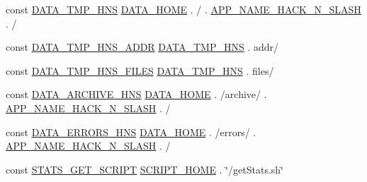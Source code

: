 \begin{DoxyCompactItemize}
\item 
const \hyperlink{application_2src_2define_8php_aac25d42dd518dd4e046490ac3c5b1f16}{D\+A\+T\+A\+\_\+\+T\+M\+P\+\_\+\+H\+NS} \hyperlink{application_2src_2define_8php_abd49961c9bba0d5462ea18f49f2e854b}{D\+A\+T\+A\+\_\+\+H\+O\+ME} . \textquotesingle{}/\textquotesingle{} . \hyperlink{application_2src_2define_8php_aafbb283144936400f27f3234053d0d8d}{A\+P\+P\+\_\+\+N\+A\+M\+E\+\_\+\+H\+A\+C\+K\+\_\+\+N\+\_\+\+S\+L\+A\+SH} . \textquotesingle{}/\textquotesingle{}
\item 
const \hyperlink{application_2src_2define_8php_adb6456774cde56cccf8a10ecd8b27f16}{D\+A\+T\+A\+\_\+\+T\+M\+P\+\_\+\+H\+N\+S\+\_\+\+A\+D\+DR} \hyperlink{application_2src_2define_8php_aac25d42dd518dd4e046490ac3c5b1f16}{D\+A\+T\+A\+\_\+\+T\+M\+P\+\_\+\+H\+NS} . \textquotesingle{}addr/\textquotesingle{}
\item 
const \hyperlink{application_2src_2define_8php_ab41d66a0819241fec75faaa2881b75f4}{D\+A\+T\+A\+\_\+\+T\+M\+P\+\_\+\+H\+N\+S\+\_\+\+F\+I\+L\+ES} \hyperlink{application_2src_2define_8php_aac25d42dd518dd4e046490ac3c5b1f16}{D\+A\+T\+A\+\_\+\+T\+M\+P\+\_\+\+H\+NS} . \textquotesingle{}files/\textquotesingle{}
\item 
const \hyperlink{application_2src_2define_8php_ac2e10636360f5b5b6fb26d0213e6bb2a}{D\+A\+T\+A\+\_\+\+A\+R\+C\+H\+I\+V\+E\+\_\+\+H\+NS} \hyperlink{application_2src_2define_8php_abd49961c9bba0d5462ea18f49f2e854b}{D\+A\+T\+A\+\_\+\+H\+O\+ME} . \textquotesingle{}/archive/\textquotesingle{} . \hyperlink{application_2src_2define_8php_aafbb283144936400f27f3234053d0d8d}{A\+P\+P\+\_\+\+N\+A\+M\+E\+\_\+\+H\+A\+C\+K\+\_\+\+N\+\_\+\+S\+L\+A\+SH} . \textquotesingle{}/\textquotesingle{}
\item 
const \hyperlink{application_2src_2define_8php_af4f12e457d3746e50a57c980b85c301b}{D\+A\+T\+A\+\_\+\+E\+R\+R\+O\+R\+S\+\_\+\+H\+NS} \hyperlink{application_2src_2define_8php_abd49961c9bba0d5462ea18f49f2e854b}{D\+A\+T\+A\+\_\+\+H\+O\+ME} . \textquotesingle{}/errors/\textquotesingle{} . \hyperlink{application_2src_2define_8php_aafbb283144936400f27f3234053d0d8d}{A\+P\+P\+\_\+\+N\+A\+M\+E\+\_\+\+H\+A\+C\+K\+\_\+\+N\+\_\+\+S\+L\+A\+SH} . \textquotesingle{}/\textquotesingle{}
\item 
const \hyperlink{application_2src_2define_8php_a226d66db407b69e575f25c7c46970fad}{S\+T\+A\+T\+S\+\_\+\+G\+E\+T\+\_\+\+S\+C\+R\+I\+PT} \hyperlink{application_2src_2define_8php_a9804a4355514926fe48d229604f4c134}{S\+C\+R\+I\+P\+T\+\_\+\+H\+O\+ME} . \char`\"{}/get\+Stats.\+sh\char`\"{}
\item 

\end{DoxyCompactItemize}
